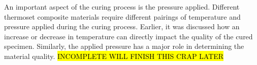 \tab An important aspect of the curing process is the pressure applied.  Different thermoset composite materials require different pairings of temperature and pressure applied during the curing process.  Earlier, it was discussed how an increase or decrease in temperature can directly impact the quality of the cured specimen.  Similarly, the applied pressure has a major role in determining the material quality. \hl{INCOMPLETE WILL FINISH THIS CRAP LATER}